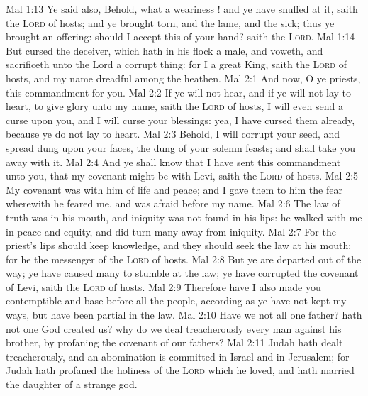 \vs Mal 1:13 Ye said also, Behold, what a weariness ! and ye have snuffed at it, saith the \textsc{Lord} of hosts; and ye brought  torn, and the lame, and the sick; thus ye brought an offering: should I accept this of your hand? saith the \textsc{Lord}.
\vs Mal 1:14 But cursed  the deceiver, which hath in his flock a male, and voweth, and sacrificeth unto the Lord a corrupt thing: for I  a great King, saith the \textsc{Lord} of hosts, and my name  dreadful among the heathen.
\vs Mal 2:1 And now, O ye priests, this commandment  for you.
\vs Mal 2:2 If ye will not hear, and if ye will not lay  to heart, to give glory unto my name, saith the \textsc{Lord} of hosts, I will even send a curse upon you, and I will curse your blessings: yea, I have cursed them already, because ye do not lay  to heart.
\vs Mal 2:3 Behold, I will corrupt your seed, and spread dung upon your faces,  the dung of your solemn feasts; and  shall take you away with it.
\vs Mal 2:4 And ye shall know that I have sent this commandment unto you, that my covenant might be with Levi, saith the \textsc{Lord} of hosts.
\vs Mal 2:5 My covenant was with him of life and peace; and I gave them to him  the fear wherewith he feared me, and was afraid before my name.
\vs Mal 2:6 The law of truth was in his mouth, and iniquity was not found in his lips: he walked with me in peace and equity, and did turn many away from iniquity.
\vs Mal 2:7 For the priest's lips should keep knowledge, and they should seek the law at his mouth: for he  the messenger of the \textsc{Lord} of hosts.
\vs Mal 2:8 But ye are departed out of the way; ye have caused many to stumble at the law; ye have corrupted the covenant of Levi, saith the \textsc{Lord} of hosts.
\vs Mal 2:9 Therefore have I also made you contemptible and base before all the people, according as ye have not kept my ways, but have been partial in the law.
\vs Mal 2:10 Have we not all one father? hath not one God created us? why do we deal treacherously every man against his brother, by profaning the covenant of our fathers?
\vs Mal 2:11 Judah hath dealt treacherously, and an abomination is committed in Israel and in Jerusalem; for Judah hath profaned the holiness of the \textsc{Lord} which he loved, and hath married the daughter of a strange god.
